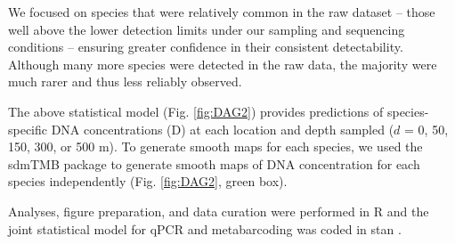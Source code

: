 \documentclass{article}
\begin{document}
We focused on species that were relatively common in the raw dataset – those well above the lower detection limits under our sampling and sequencing conditions – ensuring greater confidence in their consistent detectability. Although many more species were detected in the raw data, the majority were much rarer and thus less reliably observed.

The above statistical model (Fig. \ref{fig:DAG2}) provides predictions of species-specific DNA concentrations (D) at each location and depth sampled ($d$ = 0, 50, 150, 300, or 500 m). To generate smooth maps for each species, we used the sdmTMB package \cite{anderson2022} to generate smooth maps of DNA concentration for each species independently (Fig. \ref{fig:DAG2}, green box). 


Analyses, figure preparation, and data curation were performed in R \cite{rcoreteam2024} and the joint statistical model for qPCR and metabarcoding was coded in stan \cite{standevelopmentteam2023}.


\end{document}
